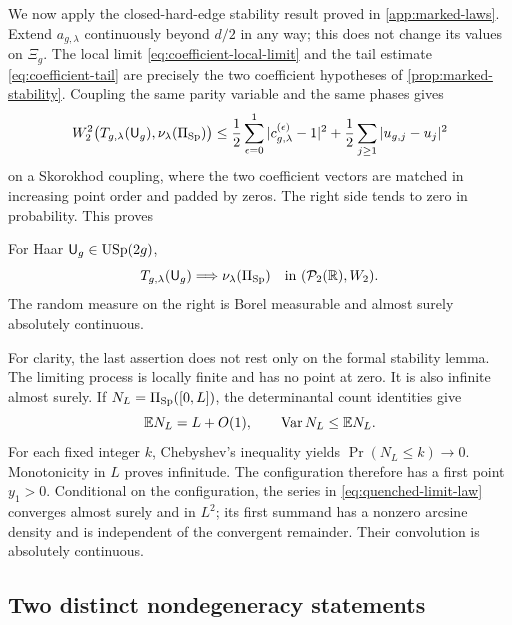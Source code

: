 We now apply the closed-hard-edge stability result proved in
\cref{app:marked-laws}.  Extend \(a_{g,\lambda}\) continuously beyond
\(d/2\) in any way; this does not change its values on \(\Xi_g\).  The
local limit \eqref{eq:coefficient-local-limit} and the tail estimate
\eqref{eq:coefficient-tail} are precisely the two coefficient hypotheses of
\cref{prop:marked-stability}.  Coupling the same parity variable and the same
phases gives
\begin{equation}
 W_2^2\bigl(T_{g,\lambda}(\mathsf U_g),\nu_\lambda(\Pi_{\mathrm{Sp}})\bigr)
 \le \frac12\sum_{\epsilon=0}^1
       |c_{g,\lambda}^{(\epsilon)}-1|^2
     +\frac12\sum_{j\ge1}|u_{g,j}-u_j|^2
 \label{eq:haar-shared-coupling}
\end{equation}
on a Skorokhod coupling, where the two coefficient vectors are matched in
increasing point order and padded by zeros.  The right side tends to zero in
probability.  This proves
\begin{proposition}
\label{prop:haar-quenched-limit}
For Haar \(\mathsf U_g\in\mathrm{USp}(2g)\),
\[
 T_{g,\lambda}(\mathsf U_g)\Longrightarrow\nu_\lambda(\Pi_{\mathrm{Sp}})
 \quad\text{in }(\mathcal P_2(\mathbb R),W_2).
\]
The random measure on the right is Borel measurable and almost surely
absolutely continuous.
\end{proposition}

For clarity, the last assertion does not rest only on the formal stability
lemma.  The limiting process is locally finite and has no point at zero.  It
is also infinite almost surely.  If
\(N_L=\Pi_{\mathrm{Sp}}([0,L])\), the determinantal count identities give
\[
 \mathbb E N_L=L+O(1),
 \qquad \operatorname{Var} N_L\le \mathbb E N_L.
\]
For each fixed integer \(k\), Chebyshev's inequality yields
\(\Pr(N_L\le k)\to0\).  Monotonicity in \(L\) proves infinitude.  The
configuration therefore has a first point \(y_1>0\).  Conditional on the
configuration, the series in \eqref{eq:quenched-limit-law} converges almost
surely and in \(L^2\); its first summand has a nonzero arcsine density and is
independent of the convergent remainder.  Their convolution is absolutely
continuous.

\subsection{Two distinct nondegeneracy statements}

